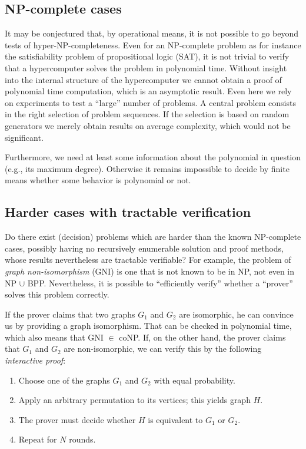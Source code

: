 \documentclass[12pt]{article}
\begin{document}
\subsection{NP-complete cases}

It may be conjectured that, by operational means,  it is not possible to go beyond
tests of hyper-NP-completeness.
Even for an NP-complete problem as for instance the satisfiability problem of propositional logic (SAT), it is not trivial to
verify that a hypercomputer solves the problem in polynomial time.
Without insight into the internal structure of the hypercomputer
we cannot obtain a proof of polynomial time computation,
which is an asymptotic result. Even here we rely on
experiments to test a ``large'' number of
problems. A central problem consists in the right selection of
problem sequences. If the selection is based on random generators
we merely obtain results on average complexity, which would not be
significant.

Furthermore, we need at least some information about the polynomial
in question (e.g., its maximum degree). Otherwise it remains
impossible to decide by finite means whether some behavior
is polynomial or not.


\subsection{Harder cases with tractable verification}

Do there exist (decision) problems which are harder
than the known NP-complete cases,
possibly having no recursively enumerable solution and proof methods,
whose results nevertheless are tractable verifiable?
For example, the problem of \emph{graph non-isomorphism} (GNI) is one that is not
known to be in NP, not even in NP $\cup$ BPP. Nevertheless, it is
possible to ``efficiently verify'' whether a ``prover''
solves this problem correctly.

If the prover claims that two graphs $G_1$ and $G_2$ are isomorphic,
he can convince us by providing a graph isomorphism. That can be checked
in polynomial time, which also means that GNI $\in$ coNP.
If, on the other hand, the prover claims that $G_1$ and $G_2$ are
non-isomorphic, we can verify this by the following \emph{interactive proof}:

\begin{enumerate}
\item Choose one of the graphs $G_1$ and $G_2$ with equal probability. \label{I:1}
\item Apply an arbitrary permutation to its vertices; this yields graph $H$.
\item The prover must decide whether $H$ is equivalent to $G_1$ or $G_2$. \label{I:3}
\item Repeat for $N$ rounds.
\end{enumerate}
\end{document}

